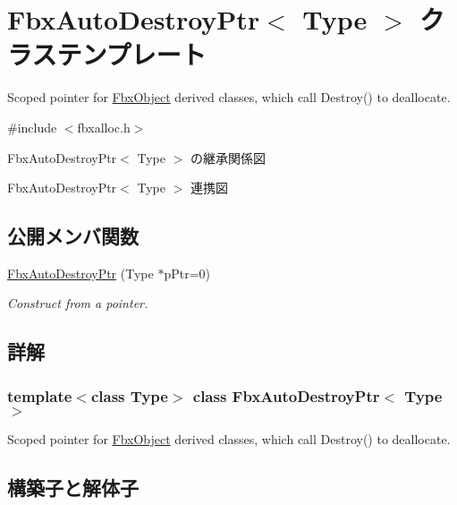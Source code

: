 \hypertarget{class_fbx_auto_destroy_ptr}{}\section{Fbx\+Auto\+Destroy\+Ptr$<$ Type $>$ クラステンプレート}
\label{class_fbx_auto_destroy_ptr}


Scoped pointer for \hyperlink{class_fbx_object}{Fbx\+Object} derived classes, which call Destroy() to deallocate.  




{\ttfamily \#include $<$fbxalloc.\+h$>$}



Fbx\+Auto\+Destroy\+Ptr$<$ Type $>$ の継承関係図


Fbx\+Auto\+Destroy\+Ptr$<$ Type $>$ 連携図
\subsection*{公開メンバ関数}
\begin{DoxyCompactItemize}
\item 
\hyperlink{class_fbx_auto_destroy_ptr_a7bf34add17eaf53502e326e1e5b0c977}{Fbx\+Auto\+Destroy\+Ptr} (Type $\ast$p\+Ptr=0)
\begin{DoxyCompactList}\small\item\em Construct from a pointer. \end{DoxyCompactList}\end{DoxyCompactItemize}


\subsection{詳解}
\subsubsection*{template$<$class Type$>$\newline
class Fbx\+Auto\+Destroy\+Ptr$<$ Type $>$}

Scoped pointer for \hyperlink{class_fbx_object}{Fbx\+Object} derived classes, which call Destroy() to deallocate. 

\subsection{構築子と解体子}
\mbox{\label{class_fbx_auto_destroy_ptr_a7bf34add17eaf53502e326e1e5b0c977}} 
